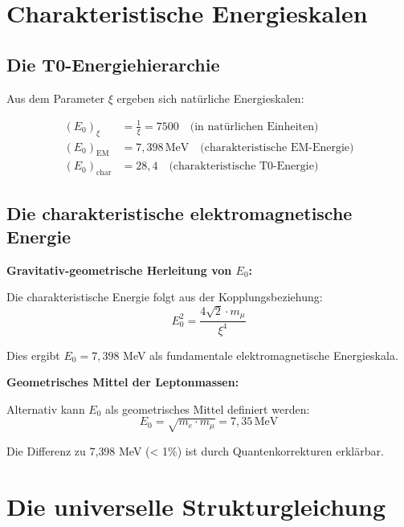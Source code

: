 \documentclass[12pt,a4paper]{article}
\begin{document}
	\section{Charakteristische Energieskalen}
	
	\subsection{Die T0-Energiehierarchie}
	
	Aus dem Parameter $\xi$ ergeben sich natürliche Energieskalen:
	
	\begin{align}
		(E_0)_{\xi} &= \frac{1}{\xi} = 7500 \quad \text{(in natürlichen Einheiten)} \\
		(E_0)_{\text{EM}} &= 7{,}398\,\mathrm{MeV} \quad \text{(charakteristische EM-Energie)} \\
		(E_0)_{\text{char}} &= 28{,}4 \quad \text{(charakteristische T0-Energie)}
	\end{align}
	
	\subsection{Die charakteristische elektromagnetische Energie}
	
	\begin{keyresult}
		\textbf{Gravitativ-geometrische Herleitung von $E_0$:}
		
		Die charakteristische Energie folgt aus der Kopplungsbeziehung:
		\begin{equation}
			E_0^2 = \frac{4\sqrt{2} \cdot m_\mu}{\xi^4}
		\end{equation}
		
		Dies ergibt $E_0 = 7{,}398$ MeV als fundamentale elektromagnetische Energieskala.
	\end{keyresult}
	
	\begin{alternative}
		\textbf{Geometrisches Mittel der Leptonmassen:}
		
		Alternativ kann $E_0$ als geometrisches Mittel definiert werden:
		\begin{equation}
			E_0 = \sqrt{m_e \cdot m_\mu} = 7{,}35\,\mathrm{MeV}
		\end{equation}
		
		Die Differenz zu 7{,}398 MeV (< 1\%) ist durch Quantenkorrekturen erklärbar.
	\end{alternative}
	
	\section{Die universelle Strukturgleichung}
	
\end{document}
